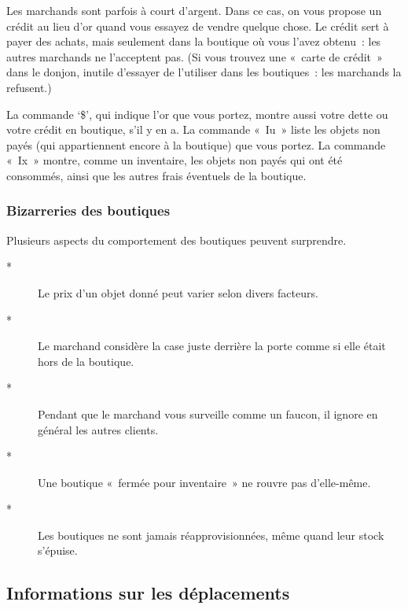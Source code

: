 \documentclass[titlepage]{article}
\begin{document}
Les marchands sont parfois à court d'argent.
Dans ce cas, on vous propose un crédit au lieu d'or quand vous essayez de
vendre quelque chose.
Le crédit sert à payer des achats, mais seulement dans la boutique où vous
l'avez obtenu~: les autres marchands ne l'acceptent pas.
(Si vous trouvez une «~carte de crédit~» dans le donjon, inutile
d'essayer de l'utiliser dans les boutiques~: les marchands la refusent.)


La commande `\$', qui indique l'or que vous portez, montre aussi votre
dette ou votre crédit en boutique, s'il y en a.
La commande «~Iu~» liste les objets non payés (qui appartiennent
encore à la boutique) que vous portez.
La commande «~Ix~» montre, comme un inventaire, les objets non payés
qui ont été consommés, ainsi que les autres frais éventuels de la
boutique.

\subsubsection{Bizarreries des boutiques}



Plusieurs aspects du comportement des boutiques peuvent surprendre.

\begin{description}
\item[{*}]
Le prix d'un objet donné peut varier selon divers facteurs.

\item[{*}]
Le marchand considère la case juste derrière la porte comme si elle était
hors de la boutique.

\item[{*}]
Pendant que le marchand vous surveille comme un faucon, il ignore en
général les autres clients.

\item[{*}]
Une boutique «~fermée pour inventaire~» ne rouvre pas d'elle-même.

\item[{*}]
Les boutiques ne sont jamais réapprovisionnées, même quand leur stock
s'épuise.

\end{description}
\subsection{Informations sur les déplacements}
\end{document}
